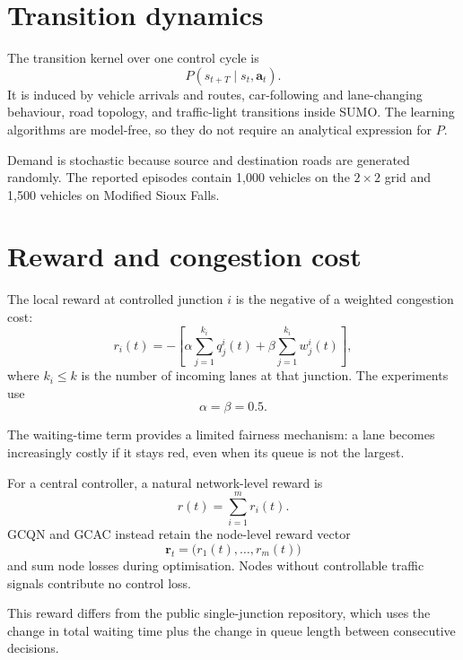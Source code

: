 \documentclass[11pt]{article}
\begin{document}
\section{Transition dynamics}

The transition kernel over one control cycle is
\begin{equation}
P\!\left(s_{t+T}\mid s_t,\mathbf{a}_t\right).
\end{equation}
It is induced by vehicle arrivals and routes, car-following and lane-changing behaviour, road topology, and traffic-light transitions inside SUMO. The learning algorithms are model-free, so they do not require an analytical expression for $P$.

Demand is stochastic because source and destination roads are generated randomly. The reported episodes contain 1,000 vehicles on the $2\times2$ grid and 1,500 vehicles on Modified Sioux Falls.

\section{Reward and congestion cost}

The local reward at controlled junction $i$ is the negative of a weighted congestion cost:
\begin{equation}
r_i(t)
=-
\left[
\alpha\sum_{j=1}^{k_i}q_j^i(t)
+
\beta\sum_{j=1}^{k_i}w_j^i(t)
\right],
\end{equation}
where $k_i\leq k$ is the number of incoming lanes at that junction. The experiments use
\begin{equation}
\alpha=\beta=0.5.
\end{equation}

The waiting-time term provides a limited fairness mechanism: a lane becomes increasingly costly if it stays red, even when its queue is not the largest.

For a central controller, a natural network-level reward is
\begin{equation}
r(t)=\sum_{i=1}^{m}r_i(t).
\end{equation}
GCQN and GCAC instead retain the node-level reward vector
\begin{equation}
\mathbf{r}_t=\bigl(r_1(t),\ldots,r_m(t)\bigr)
\end{equation}
and sum node losses during optimisation. Nodes without controllable traffic signals contribute no control loss.

This reward differs from the public single-junction repository, which uses the change in total waiting time plus the change in queue length between consecutive decisions.
\end{document}
